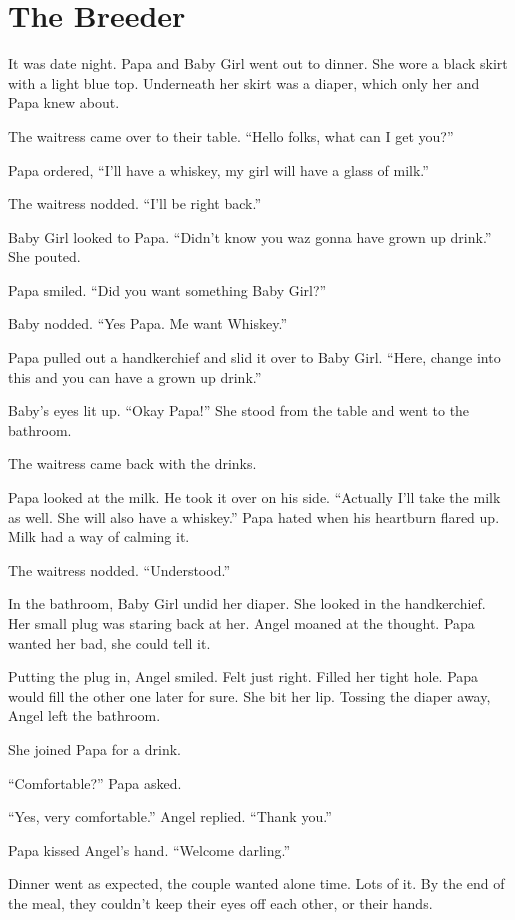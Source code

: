 \section{The Breeder}

     It was date night. Papa and Baby Girl went out to dinner. She wore a black skirt with a light blue top. Underneath her skirt was a diaper, which only her and Papa knew about.

     The waitress came over to their table. “Hello folks, what can I get you?”

     Papa ordered, “I’ll have a whiskey, my girl will have a glass of milk.”

     The waitress nodded. “I’ll be right back.”

     Baby Girl looked to Papa. “Didn’t know you waz gonna have grown up drink.” She pouted.

     Papa smiled. “Did you want something Baby Girl?”

     Baby nodded. “Yes Papa. Me want Whiskey.”

     Papa pulled out a handkerchief and slid it over to Baby Girl. “Here, change into this and you can have a grown up drink.”

     Baby’s eyes lit up. “Okay Papa!” She stood from the table and went to the bathroom.

     The waitress came back with the drinks.

     Papa looked at the milk. He took it over on his side. “Actually I’ll take the milk as well. She will also have a whiskey.” Papa hated when his heartburn flared up. Milk had a way of calming it.

     The waitress nodded. “Understood.”

     In the bathroom, Baby Girl undid her diaper. She looked in the handkerchief. Her small plug was staring back at her. Angel moaned at the thought. Papa wanted her bad, she could tell it.

     Putting the plug in, Angel smiled. Felt just right. Filled her tight hole. Papa would fill the other one later for sure. She bit her lip. Tossing the diaper away, Angel left the bathroom.

     She joined Papa for a drink.

     “Comfortable?” Papa asked.

     “Yes, very comfortable.” Angel replied. “Thank you.”

     Papa kissed Angel’s hand. “Welcome darling.”

     Dinner went as expected, the couple wanted alone time. Lots of it. By the end of the meal, they couldn’t keep their eyes off each other, or their hands.


